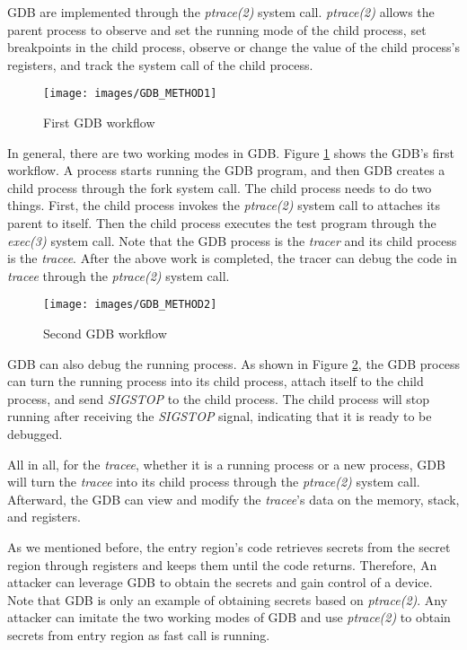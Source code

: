 GDB are implemented through the \emph{ptrace(2)} system call. 
\emph{ptrace(2)} allows the parent process to observe and set the running mode of 
the child process, set breakpoints in the child process, observe or 
change the value of the child process's registers, and track the system 
call of the child process.

\begin{figure}[tbp]
  \centering
  \texttt{[image: images/GDB\_METHOD1]}
  \caption[Short description]{First GDB workflow}
  \label{fig:GDB_METHOD1}
\end{figure}

In general, there are two working modes in GDB. Figure \ref{fig:GDB_METHOD1} shows 
the GDB's first workflow. A process starts running the GDB program, 
and then GDB creates a child process through the fork system call. 
The child process needs to do two things. First, the child process 
invokes the \emph{ptrace(2)} system call to attaches its parent to itself. 
Then the child process executes the test program through the \emph{exec(3)} 
system call. Note that the GDB process is the \emph{tracer} and its child process 
is the \emph{tracee}. After the above work is completed, the tracer can debug the
code in \emph{tracee} through the \emph{ptrace(2)} system call.


\begin{figure}[tbp]
  \centering
  \texttt{[image: images/GDB\_METHOD2]}
  \caption[Short description]{Second GDB workflow}
  \label{fig:GDB_METHOD2}
\end{figure}

GDB can also debug the running process. As shown in Figure \ref{fig:GDB_METHOD2}, 
the GDB process can turn the running process into its child process, 
attach itself to the child process, and send \emph{SIGSTOP} to the child process. 
The child process will stop running after receiving the \emph{SIGSTOP} signal, 
indicating that it is ready to be debugged.

All in all, for the \emph{tracee}, whether it is a running process or 
a new process, GDB will turn the \emph{tracee} into its child process 
through the \emph{ptrace(2)} system call. Afterward, the GDB can view and modify 
the \emph{tracee}'s data on the memory, stack, and registers.

As we mentioned before, the entry region's code retrieves secrets 
from the secret region through registers and keeps them until the code 
returns. Therefore, An attacker can leverage GDB  to obtain the secrets 
and gain control of a device.  Note that GDB is only an example of obtaining 
secrets based on \emph{ptrace(2)}. Any attacker can imitate the two working modes of 
GDB and use \emph{ptrace(2)} to obtain secrets from entry region as fast call is running.

